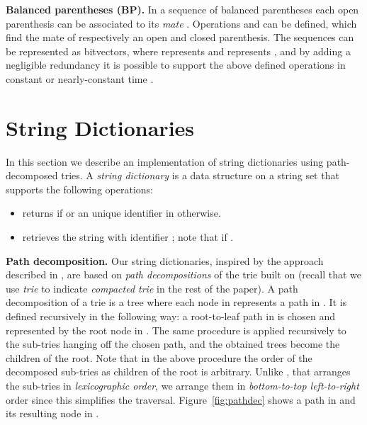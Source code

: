 \documentclass[a4paper,11pt]{article}
\newcommand{\shrinkitems}{\setlength{\itemsep}{0ex}} \newcommand{\sshrinkitems}{\setlength{\itemsep}{-1ex}} \newcommand{\shrinktable}{\setlength{\abovecaptionskip}{-1ex}\setlength{\belowcaptionskip}{-1ex}}
\newcommand{\ttlpar}[1]{\noindent\textbf{#1}}
\theoremstyle{nonumberplain}
\begin{document}
\ttlpar{Balanced parentheses (BP).}  
In a sequence of balanced parentheses each open parenthesis 
can be associated to its \emph{mate} . Operations
 and  can be defined, which find the mate of
respectively an open and closed parenthesis. The sequences can be
represented as bitvectors, where  represents  and
 represents , and by adding a negligible
redundancy it is possible to support the above defined operations in
constant or nearly-constant time \cite{jacobson89,munro97}.

\section{String Dictionaries}
\label{sec:stringdict}
In this section we describe an implementation of string dictionaries
using path-decomposed tries. A \emph{string dictionary} is a data
structure on a string set  that supports
the following operations:
\begin{itemize}
\shrinkitems
\item  returns  if  or an
  unique identifier in  otherwise.
\item  retrieves the string with identifier ; note that
   if .
\end{itemize}

\ttlpar{Path decomposition.}
Our string dictionaries, inspired by the approach described in
\cite{pods08}, are based on \emph{path decompositions} of the trie
built on  (recall that we use \emph{trie} to indicate 
\emph{compacted trie} in the rest of the paper).  A path decomposition
 of a trie  is a tree where each node in
 represents a path in . It is defined
recursively in the following way: a root-to-leaf path in 
is chosen and represented by the root node in . The
same procedure is applied recursively to the sub-tries hanging off the
chosen path, and the obtained trees become the children of the root.
Note that in the above procedure the order of the decomposed sub-tries as
children of the root is arbitrary. Unlike \cite{pods08}, that arranges
the sub-tries in \emph{lexicographic order}, we arrange them in
\emph{bottom-to-top left-to-right} order since this simplifies the
traversal. Figure~\ref{fig:pathdec} shows a path in  and its resulting node in .
\end{document}
